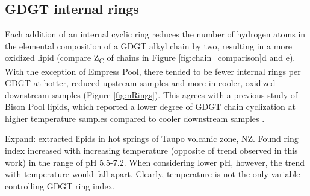

\subsection{GDGT internal rings} Each addition of an internal cyclic ring reduces the number of hydrogen atoms in the elemental composition of a GDGT alkyl chain by two, resulting in a more oxidized lipid (compare Z\textsubscript{C} of chains in Figure \ref{fig:chain_comparison}d and e). With the exception of Empress Pool, there tended to be fewer internal rings per GDGT at hotter,  reduced upstream samples and more in cooler, oxidized downstream samples (Figure \ref{fig:nRings}). This agrees with a previous study of Bison Pool lipids, which reported a lower degree of GDGT chain cyclization at higher temperature samples compared to cooler downstream samples \citep{schubotz2013spatial}.

Expand:
\cite{kaur2015temperature} extracted lipids in hot springs of Taupo volcanic zone, NZ. Found ring index increased with increasing temperature (opposite of trend observed in this work) in the range of pH 5.5-7.2. When considering lower pH, however, the trend with temperature would fall apart. Clearly, temperature is not the only variable controlling GDGT ring index.

